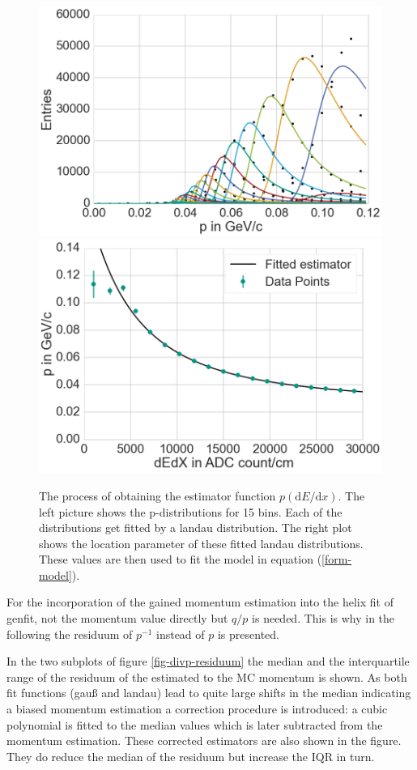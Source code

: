 \begin{figure}
  \centering
  \includegraphics[width=0.48\linewidth]{figures/vxd/fitLandau1.png}
  \includegraphics[width=0.48\linewidth]{figures/vxd/fitLandau2.png}
  \caption[The process of obtaining the estimator function $p(\mathrm d E/\mathrm d x)$.]{The process of obtaining the estimator function $p(\mathrm d E/\mathrm d x)$. The left picture shows the p-distributions for 15 \dedx bins. Each of the distributions get fitted by a landau distribution. The right plot shows the location parameter of these fitted landau distributions. These values are then used to fit the model in equation (\ref{form-model}).}
  \label{fig-fit-bins}
\end{figure}

For the incorporation of the gained momentum estimation into the helix fit of genfit, not the momentum value directly but $q/p$ is needed. This is why in the following the residuum of $p^{-1}$ instead of $p$ is presented.

In the two subplots of figure \ref{fig-divp-residuum} the median and the interquartile range of the residuum of the estimated to the MC momentum is shown. As both fit functions (gauß and landau) lead to quite large shifts in the median indicating a biased momentum estimation a correction procedure is introduced: a cubic polynomial is fitted to the median values which is later subtracted from the momentum estimation. These corrected estimators are also shown in the figure. They do reduce the median of the residuum but increase the IQR in turn.

